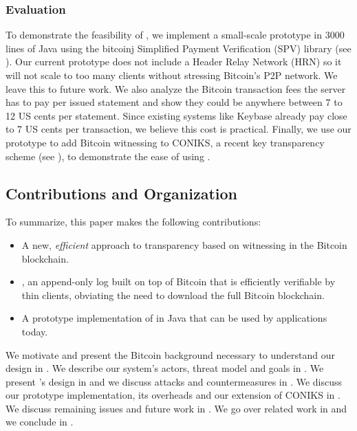 \subsubsection{Evaluation}
To demonstrate the feasibility of \Sys, we implement a small-scale prototype in 3000 lines of Java using the bitcoinj Simplified Payment Verification (SPV) library\cite{bitcoinj} (see ).
Our current prototype does not include a Header Relay Network (HRN) so it will not scale to too many \Sys clients without stressing Bitcoin's P2P network.
We leave this to future work.
We also analyze the Bitcoin transaction fees the server has to pay per issued statement and show they could be anywhere between 7 to 12 US cents per statement.
Since existing systems like Keybase\cite{keybase} already pay close to 7 US cents per transaction, we believe this cost is practical.
Finally, we use our prototype to add Bitcoin witnessing to CONIKS\cite{coniks}, a recent key transparency scheme (see ), to demonstrate the ease of using \Sys.


\subsection{Contributions and Organization}

To summarize, this paper makes the following contributions:
\begin{itemize}
\item A new, \emph{efficient} approach to transparency based on witnessing in the Bitcoin blockchain.
\item \Sys, an append-only log built on top of Bitcoin that is efficiently verifiable by thin clients, obviating the need to download the full Bitcoin blockchain.
\item A prototype implementation of \Sys in Java that can be used by applications today.
\end{itemize}

 We motivate \Sys and present the Bitcoin background necessary to understand our design in . We describe our system's actors, threat model and goals in . We present \Sys's design in  and we discuss attacks and countermeasures in . We discuss our prototype implementation, its overheads and our extension of CONIKS in .
We discuss remaining issues and future work in .
We go over related work in  and we conclude in .
